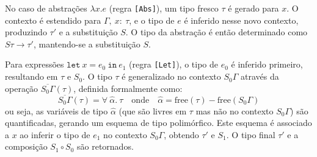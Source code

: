 No caso de abstrações $\lambda x.e$ (regra \texttt{[Abs]}), um tipo fresco $\tau$ é gerado para $x$.
O contexto é estendido para $\Gamma,\ x{:}\ \tau$, e o tipo de $e$ é inferido nesse novo contexto, produzindo $\tau'$ e a substituição $S$.
O tipo da abstração é então determinado como $S\tau \rightarrow \tau'$, mantendo-se a substituição $S$.

Para expressões $\mathtt{let}\ x = e_0\ \mathtt{in}\ e_1$ (regra \texttt{[Let]}), o tipo de $e_0$ é inferido primeiro, resultando em $\tau$ e $S_0$.
O tipo $\tau$ é generalizado no contexto $S_0\Gamma$ através da operação $\overline{S_0\Gamma}(\tau)$, definida formalmente como:
\[
\overline{S_0\Gamma}(\tau) = \forall\ \hat{\alpha}.\ \tau \quad \text{onde} \quad \hat{\alpha} = \text{free}(\tau) - \text{free}(S_0\Gamma)
\]
ou seja, as variáveis de tipo $\hat{\alpha}$ (que são livres em $\tau$ mas não no contexto $S_0\Gamma$) são quantificadas, gerando um esquema de tipo polimórfico.
Este esquema é associado a $x$ ao inferir o tipo de $e_1$ no contexto $S_0\Gamma$, obtendo $\tau'$ e $S_1$.
O tipo final $\tau'$ e a composição $S_1 \circ S_0$ são retornados.
